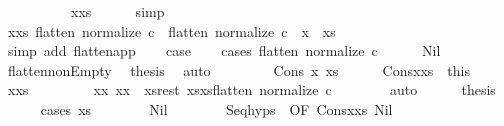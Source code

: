 \begin{isabellebody}
\ \ \ \ \ \ \ \ \ \ x{\isacharhash}xs{\isachardoublequoteclose}\isanewline
\ \ \ \ \isamarkupfalse%
\ simp\isanewline
\ \ \isamarkupfalse%
\ x{\isacharunderscore}xs{\isacharcolon}\ {\isachardoublequoteopen}flatten\ {\isacharparenleft}normalize\ c{}{\isacharparenright}\ {\isacharat}\ flatten\ {\isacharparenleft}normalize\ c{}{\isacharparenright}\ {\isacharequal}\ x\ {\isacharhash}\ xs{\isachardoublequoteclose}\ \isanewline
\ \ \ \ \isamarkupfalse%
\ {\isacharparenleft}simp\ add{\isacharcolon}\ flatten{\isacharunderscore}app{\isacharparenright}\isanewline
\ \ \isamarkupfalse%
\ {\isacharquery}case\isanewline
\ \ \isamarkupfalse%
\ {\isacharparenleft}cases\ {\isachardoublequoteopen}flatten\ {\isacharparenleft}normalize\ c{}{\isacharparenright}{\isachardoublequoteclose}{\isacharparenright}\isanewline
\ \ \ \ \isamarkupfalse%
\ Nil\isanewline
\ \ \ \ \isamarkupfalse%
\ flatten{\isacharunderscore}nonEmpty\ \isamarkupfalse%
\ {\isacharquery}thesis\ \isamarkupfalse%
\ auto\isanewline
\ \ \isamarkupfalse%
\isanewline
\ \ \ \ \isamarkupfalse%
\ {\isacharparenleft}Cons\ x{}\ xs{}{\isacharparenright}\isanewline
\ \ \ \ \isamarkupfalse%
\ Cons{\isacharunderscore}x{}{\isacharunderscore}xs{}\ {\isacharequal}\ this\isanewline
\ \ \ \ \isamarkupfalse%
\ x{\isacharunderscore}xs\ \isamarkupfalse%
\ \isanewline
\ \ \ \ \ \ x{\isacharunderscore}x{}{\isacharcolon}\ {\isachardoublequoteopen}x{\isacharequal}x{}{\isachardoublequoteclose}\ \ xs{\isacharunderscore}rest{\isacharcolon}\ {\isachardoublequoteopen}xs{\isacharequal}xs{}{\isacharat}flatten\ {\isacharparenleft}normalize\ c{}{\isacharparenright}{\isachardoublequoteclose}\isanewline
\ \ \ \ \ \ \isamarkupfalse%
\ auto\isanewline
\ \ \ \ \isamarkupfalse%
\ {\isacharquery}thesis\isanewline
\ \ \ \ \isamarkupfalse%
\ {\isacharparenleft}cases\ xs{}{\isacharparenright}\isanewline
\ \ \ \ \ \ \isamarkupfalse%
\ Nil\isanewline
\ \ \ \ \ \ \isamarkupfalse%
\ Seq{\isachardot}hyps\ {\isacharparenleft}{}{\isacharparenright}\ {\isacharbrackleft}OF\ Cons{\isacharunderscore}x{}{\isacharunderscore}xs{}{\isacharbrackright}\ Nil\isanewline

\end{isabellebody}
